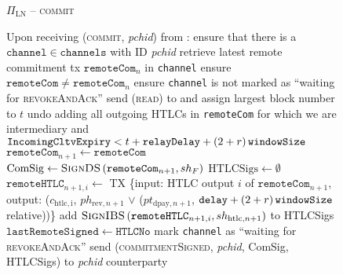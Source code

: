 
  \begin{figure}[H]
    \begin{protocolbox}{$\Pi_{\mathrm{LN}}$ -- \textsc{commit}}
      \begin{algorithmic}[1]
        \State Upon receiving (\textsc{commit}, \textit{pchid}) from
        \environment:
        \Indent
          \State ensure that there is a $\mathtt{channel} \in \mathtt{channels}$
          with ID \textit{pchid}
          \State retrieve latest remote commitment tx $\mathtt{remoteCom}_n$ in
          \texttt{channel}
          \State ensure $\mathtt{remoteCom} \neq \mathtt{remoteCom}_n$
          \State ensure \texttt{channel} is not marked as ``waiting for
          \textsc{revokeAndAck}''
          \label{alg:protocol:pay:commit:nomark}
          \State send (\textsc{read}) to \ledger{} and assign largest block
          number to $t$
          \State undo adding all outgoing HTLCs in \texttt{remoteCom} for which
          we are intermediary and $\mathtt{IncomingCltvExpiry} < t +
          \mathtt{relayDelay} + \left(2 + r\right)\texttt{windowSize}$
          \State $\mathtt{remoteCom}_{n+1} \gets \mathtt{remoteCom}$
          \State $\mathrm{ComSig} \gets
          \textsc{SignDS}\left(\mathtt{remoteCom}_{n+1}, sh_F\right)$
          \State $\mathrm{HTLCSigs} \gets \emptyset$
            \State $\mathtt{remoteHTLC}_{n+1, i} \gets$ TX \{input: HTLC output
            $i$ of $\mathtt{remoteCom}_{n+1}$, output: ($c_{\mathrm{htlc, i}}$,
            $ph_{\mathrm{rev}, n+1}$ $\vee$ ($pt_{\mathrm{dpay}, n+1}$,
            $\mathtt{delay} + \left(2 + r\right)\texttt{windowSize}{}$ relative))\}
            \State add $\textsc{SignIBS}\left(\mathtt{remoteHTLC}_{n+1, i},
            sh_{\mathrm{htlc}, n+1}\right)$ to HTLCSigs
          \EndFor
          \State $\mathtt{lastRemoteSigned} \gets \mathtt{HTLCNo}$
          \State mark \texttt{channel} as ``waiting for \textsc{revokeAndAck}''
          \label{alg:protocol:pay:commit:mark}
          \State send (\textsc{commitmentSigned}, \textit{pchid}, ComSig,
          HTLCSigs) to \textit{pchid} counterparty
        \EndIndent
      \end{algorithmic}
    \end{protocolbox}
    \caption{}
    \label{alg:protocol:pay:commit}
  \end{figure}

